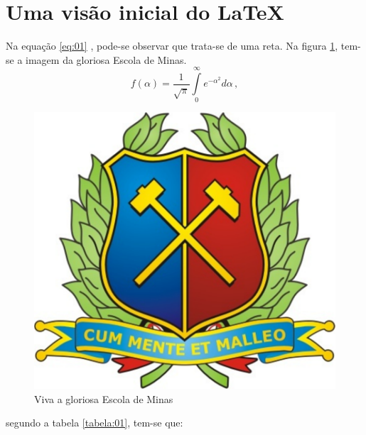 \documentclass[a4paper,12pt]{article}%
\begin{document}
\section{Uma visão inicial do LaTeX}  \label{sec:01} 
Na equação \ref{eq:01} , pode-se observar que trata-se de uma reta. Na figura \ref{fig:01}, tem-se a imagem da gloriosa Escola de Minas.
\begin{equation}
f(\alpha) = \frac{1}{\sqrt{\pi}} \int \limits_{0}^{\infty} e^{-\alpha^{2}} d \alpha \,,
\label{eq:01}
\end{equation}





\begin{figure}
\centering	
\includegraphics[scale=0.2]{logo-unidade.pdf}
\caption{Viva a gloriosa Escola de Minas}
\label{fig:01}
\end{figure}


segundo a tabela \ref{tabela:01}, tem-se que:
\end{document}

